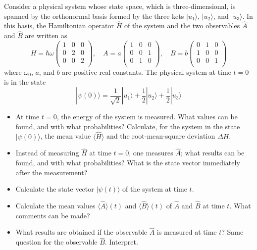 \documentclass[12pt,a4paper]{article}
\newenvironment{problem}[2][Problem]{\begin{trivlist}
\item[\hskip \labelsep {\bfseries #1}\hskip \labelsep {\bfseries #2.}]}{\end{trivlist}}
\begin{document}
\begin{problem}{4}
[C-T Exercise 3-14] Consider a physical system whose state space, which is three-dimensional, is spanned by the orthonormal basis formed by the three kets $|u_1\rangle$, $|u_2\rangle$, and $|u_3\rangle$. In this basis, the Hamiltonian operator $\hat{H}$ of the system and the two observables $\hat{A}$ and $\hat{B}$ are written as
\[
H=\hbar\omega\left(\begin{array}{ccc}
1&0&0\\
0&2&0\\
0&0&2\\
\end{array}\right),\quad A=a\left(\begin{array}{ccc}
1&0&0\\
0&0&1\\
0&1&0\\
\end{array}\right),\quad B=b\left(\begin{array}{ccc}
0&1&0\\
1&0&0\\
0&0&1\\
\end{array}\right)
\]
where $\omega_0$, $a$, and $b$ are positive real constants. The physical system at time $t=0$ is in the state
\[
|\psi(0)\rangle=\frac{1}{\sqrt{2}}|u_1\rangle+\frac{1}{2}|u_2\rangle+\frac{1}{2}|u_3\rangle
\]
\begin{itemize}
\item[(a)] At time $t=0$, the energy of the system is measured. What values can be found, and with what probabilities? Calculate, for the system in the state $|\psi(0)\rangle$, the mean value $\langle\hat{H}\rangle$ and the root-mean-square deviation $\Delta H$.
\item[(b)] Instead of measuring $\hat{H}$ at time $t=0$, one measures $\hat{A}$; what results can be found, and with what probabilities? What is the state vector immediately after the measurement?
\item[(c)] Calculate the state vector $|\psi(t)\rangle$ of the system at time $t$.
\item[(d)] Calculate the mean values $\langle\hat{A}\rangle(t)$ and $\langle\hat{B}\rangle(t)$ of $\hat{A}$ and $\hat{B}$ at time $t$. What comments can be made?
\item[(e)] What results are obtained if the observable $\hat{A}$ is measured at time $t$? Same question for the observable $\hat{B}$. Interpret.
\end{itemize}
\end{problem}
\end{document}
